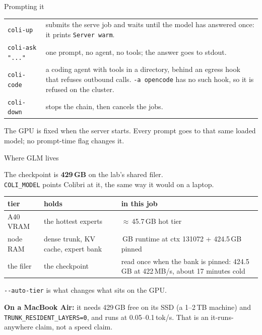\documentclass[aspectratio=169]{beamer}
\newcommand{\keybox}[1]{%
  \begin{center}
  \colorbox{black!8}{\parbox{0.92\textwidth}{\centering #1}}
  \end{center}}
\begin{document}
\begin{frame}{Prompting it}

\small
\begin{tabular}{@{}lp{}@{}}
\toprule
\texttt{coli-up} & submits the serve job and waits until the model has answered once: it prints \texttt{Server warm}. \\
\texttt{coli-ask "..."} & one prompt, no agent, no tools; the answer goes to stdout. \\
\texttt{coli-code} & a coding agent with tools in a directory, behind an egress hook that refuses outbound calls. \texttt{-a opencode} has no such hook, so it is refused on the cluster. \\
\texttt{coli-down} & stops the chain, then cancels the jobs. \\
\bottomrule
\end{tabular}

\vspace{1em}
\keybox{The GPU is fixed when the server starts. Every prompt goes to that same loaded model; no prompt-time flag changes it.}

\end{frame}

\begin{frame}{Where GLM lives}

\small
The checkpoint is \textbf{429\,GB} on the lab's shared filer.\\
\texttt{COLI\_MODEL} points Colibri at it, the same way it would on a laptop.

\vspace{0.6em}
\begin{center}
\begin{tabular}{@{}ll>{\raggedright\arraybackslash}p{}@{}}
\toprule
tier & holds & in this job \\
\midrule
A40 VRAM & the hottest experts & $\approx$\,45.7\,GB hot tier \\
node RAM & dense trunk, KV cache, expert bank & 45.0\,GB runtime at ctx 131072 + 424.5\,GB pinned \\
the filer & the checkpoint & read once when the bank is pinned: 424.5\,GB at 422\,MB/s, about 17 minutes cold \\
\bottomrule
\end{tabular}
\end{center}

\vspace{0.4em}
\texttt{-{}-auto-tier} is what changes what sits on the GPU.

\vspace{0.4em}
\textbf{On a MacBook Air:} it needs 429\,GB free on its SSD (a 1--2\,TB machine) and \texttt{TRUNK\_RESIDENT\_LAYERS=0}, and runs at 0.05--0.1\,tok/s. That is an it-runs-anywhere claim, not a speed claim.

\end{frame}
\end{document}
